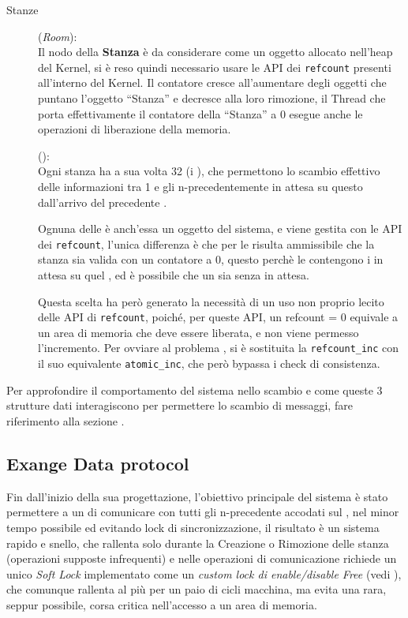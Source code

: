 \begin{description}
\item[Stanze] (\textit{Room}):\\
Il nodo della \textbf{Stanza} è da considerare come un oggetto allocato nell'heap del Kernel, si è reso
quindi necessario usare le API dei \texttt{refcount} presenti all'interno del Kernel. Il contatore cresce all'aumentare
degli oggetti che puntano l'oggetto ``Stanza'' e decresce alla loro rimozione, il Thread che porta
effettivamente il contatore della ``Stanza'' a 0 esegue anche le operazioni di liberazione della memoria.

\item[\Topic] (\exangeRoom):\\
Ogni stanza ha a sua volta 32 \exangeRoom (i \Topic), che permettono lo scambio effettivo delle informazioni
tra 1 \Writer e gli n-\Reader precedentemente in attesa su questo \Topic dall'arrivo del precedente \Writer.

Ognuna delle \exangeRoom è anch'essa un oggetto del sistema, e viene gestita con le API dei \texttt{refcount},
l'unica differenza è che per le \exangeRoom risulta ammissibile che la stanza sia valida con un contatore a 0,
questo perchè le \exangeRoom contengono i \Reader in attesa su quel \Topic, ed è possibile che un \Topic sia
senza \Reader in attesa.

Questa scelta ha però generato la necessità di un uso non proprio lecito delle API di \texttt{refcount},
poiché, per queste API, un refcount = 0 equivale a un area di memoria che deve essere liberata, e non viene permesso
l'incremento. Per ovviare al problema , si è sostituita la \verb|refcount_inc| con il suo equivalente
\verb|atomic_inc|, che però bypassa i check di consistenza.
\end{description}

\begin{footnotesize}
Per approfondire il comportamento del sistema nello scambio e come queste 3 strutture dati interagiscono per permettere
lo scambio di messaggi, fare riferimento alla sezione .
\end{footnotesize}

\newpage

\subsection{Exange Data protocol} \label{exangeDataProtocol}

Fin dall'inizio della sua progettazione, l'obiettivo principale del sistema è stato permettere a un \Writer di
comunicare con tutti gli n-\Reader precedente accodati sul \Topic, nel minor tempo possibile ed evitando lock
di sincronizzazione, il risultato è un sistema rapido e snello, che rallenta solo durante la Creazione o Rimozione
delle stanza (operazioni supposte infrequenti) e nelle operazioni di comunicazione richiede un unico \textit{Soft Lock}
implementato come un \textit{custom lock di enable/disable Free} (vedi ), che comunque
rallenta al più per un paio di cicli macchina, ma evita una rara, seppur possibile, corsa critica nell'accesso a un area
di memoria.

